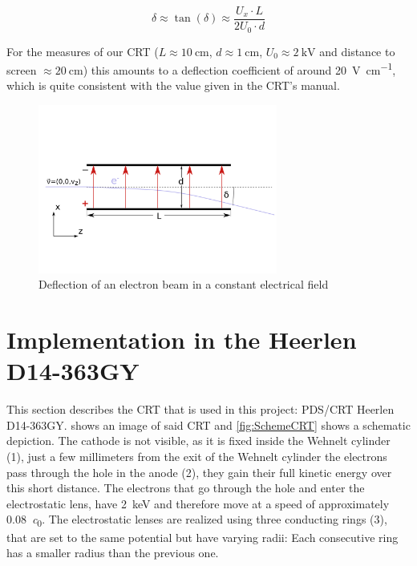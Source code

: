 \begin{equation}\label{key}
	\delta \approx \tan(\delta) \approx \frac{U_x\cdot L}{2 U_0 \cdot d}
\end{equation}


For the measures of our CRT ($ L \approx \SI{10}{\centi\meter}$, $d \approx \SI{1}{\centi\meter}$, $U_0 \approx \SI{2}{\kilo\volt}$ and distance to screen $\approx \SI{20}{\centi\meter}$) this amounts to a deflection coefficient of around \SI{20}{\volt\per\centi\meter}, which is quite consistent with the value given in the CRT's manual. 

\begin{figure}
	\centering
	\includegraphics[width=0.7\textwidth]{Chapters/CRT-Basics/DeflectionPlate2}
	\caption{Deflection of an electron beam in a constant electrical field}
	\label{fig:deflectionplate2}
\end{figure}

\section{Implementation in the Heerlen D14-363GY }


This section describes the CRT that is used in this project: PDS/CRT Heerlen D14-363GY.  shows an image of said CRT and \cref{fig:SchemeCRT} shows a schematic depiction. The cathode is not visible, as it is fixed inside the Wehnelt cylinder (1), just a few millimeters from the exit of the Wehnelt cylinder the electrons pass through the hole in the anode (2), they gain their full kinetic energy over this short distance. The electrons that go through the hole and enter the electrostatic lens, have \SI{2}{\kilo\electronvolt} and therefore move at a speed of approximately \SI{0.08}{\clight}. 
The electrostatic lenses are realized using three conducting rings (3), that are set to the same potential but have varying radii: Each consecutive ring has a smaller radius than the previous one. 

